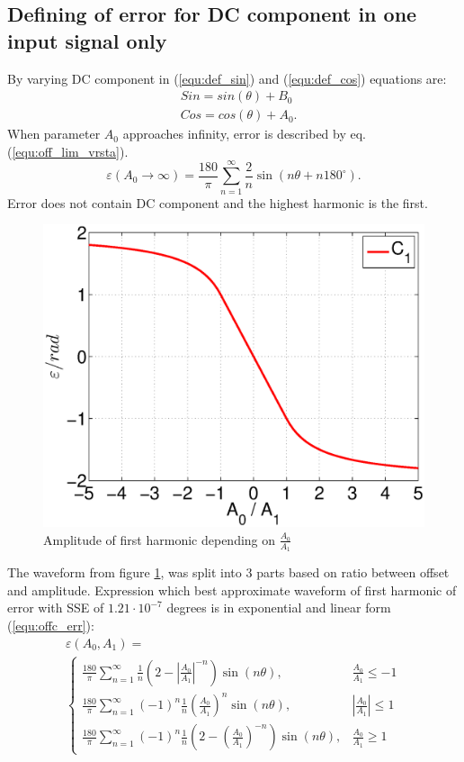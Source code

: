 \documentclass[a4paper]{article}
\begin{document}
\subsection{Defining of error for DC component in one input signal only}
\label{DCoff}
By varying DC component in (\ref{equ:def_sin}) and (\ref{equ:def_cos}) equations are:
\begin{eqnarray}
&Sin = sin(\theta)+ B_0\\
&Cos = cos(\theta) + A_0.
\end{eqnarray}
When parameter $A_0$ approaches infinity, error is described by eq. (\ref{equ:off_lim_vrsta}).
\begin{equation}
\label{equ:off_lim_vrsta}
\varepsilon (A_0 \rightarrow \infty) = \frac{180}{\pi}\sum_{n=1}^{\infty}\frac{2}{n} \sin (n \theta + n 180^\circ).
\end{equation}
Error does not contain DC component and the highest harmonic is the first.
\begin{figure}[!htb]
	\begin{center}
		\includegraphics[width=\linewidth]{./Slike/off.eps}
		\caption{Amplitude of first harmonic depending on  $\frac{A_0}{A_1}$} \label{fig:off}
	\end{center}
\end{figure}
The waveform from figure \ref{fig:off}, was split into 3 parts based on ratio between offset and amplitude. Expression which best approximate waveform of first harmonic of error with SSE of $1.21 \cdot 10^{-7}$ degrees is in exponential and linear form (\ref{equ:offc_err}):
\begin{multline}
\label{equ:offc_err}
\varepsilon(A_0, A_1)=\\
\begin{cases}
\frac{180}{\pi}\sum_{n=1}^{\infty} \frac{1}{n}(2-|\frac{A_0}{A_1}|^{-n}) \sin (n \theta ), & \frac{A_0}{A_1}\leq -1 \\
\frac{180}{\pi}\sum_{n=1}^{\infty}(-1)^n\frac{1}{n}(\frac{A_0}{A_1})^n \sin (n \theta ), & |\frac{A_0}{A_1}|\leq 1 \\
\frac{180}{\pi}\sum_{n=1}^{\infty}(-1)^n\frac{1}{n}(2-(\frac{A_0}{A_1})^{-n}) \sin (n \theta ), & \frac{A_0}{A_1}\geq 1
\end{cases}
\end{multline}
\end{document}
